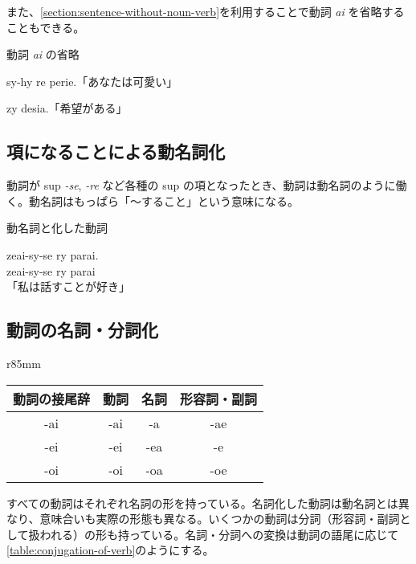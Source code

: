 また、\cref{section:sentence-without-noun-verb}を利用することで動詞 \emph{ai} を省略することもできる。

\begin{itembox}[l]{動詞 \emph{ai} の省略}
    \begin{pindent}
        \noindent
        sy-hy re perie.「あなたは可愛い」

        \noindent
        zy desia.「希望がある」
    \end{pindent}
\end{itembox}

\subsection{項になることによる動名詞化}

動詞が sup \emph{-se}, \emph{-re} など各種の sup の項となったとき、動詞は動名詞のように働く。動名詞はもっぱら「～すること」という意味になる。

\begin{itembox}[l]{動名詞と化した動詞}
    \begin{pindent}
        \noindent
        zeai-sy-se ry parai. \\
        zeai-sy-se
            ry parai \\
        「私は話すことが好き」
    \end{pindent}
\end{itembox}

\subsection{動詞の名詞・分詞化}

\begin{wraptable}[8]{r}{85mm}
    \centering
    \caption{動詞の名詞・分詞化}
    \label{table:conjugation-of-verb}
    \begin{tabular}{cccc}
        \toprule
        動詞の接尾辞 & 動詞 & 名詞 & 形容詞・副詞 \\
        \midrule
        -ai & -ai & -a  & -ae \\
        -ei & -ei & -ea & -e  \\
        -oi & -oi & -oa & -oe \\
        \bottomrule
    \end{tabular}
\end{wraptable}

すべての動詞はそれぞれ名詞の形を持っている。名詞化した動詞は動名詞とは異なり、意味合いも実際の形態も異なる。いくつかの動詞は分詞（形容詞・副詞として扱われる）の形も持っている。名詞・分詞への変換は動詞の語尾に応じて\cref{table:conjugation-of-verb}のようにする。

